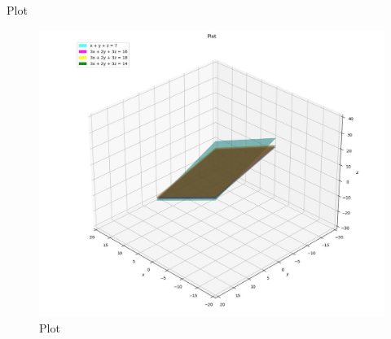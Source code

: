 \documentclass{beamer}
\begin{document}
\begin{frame}{Plot}
\begin{figure}
	\centering
	\includegraphics[width=0.5\columnwidth]{../figs/plot_p.jpg}
	\caption{Plot}
	\label{fig:fig}
\end{figure}
\end{frame}
\end{document}

